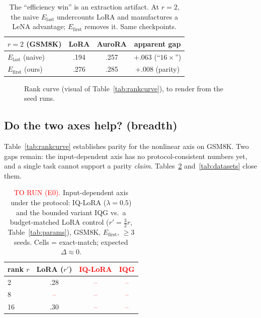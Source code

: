 \documentclass[preprint,11pt]{elsarticle}
\begin{document}
\begin{table}[t]\centering
\caption{The ``efficiency win'' is an extraction artifact. At $r{=}2$, the naive $E_{\text{last}}$ undercounts LoRA and
manufactures a LeNA advantage; $E_{\text{first}}$ removes it. Same checkpoints.}
\label{tab:artifact}
\begin{tabular}{lccc}
\toprule
$r{=}2$ (GSM8K) & LoRA & AuroRA & apparent gap\\
\midrule
$E_{\text{last}}$ (naive)  & .194 & .257 & $+.063$ (``$16\times$'')\\
$E_{\text{first}}$ (ours)  & .276 & .285 & $+.008$ (parity)\\
\bottomrule
\end{tabular}
\end{table}

\begin{figure}[t]\centering
{}
\caption{Rank curve (visual of Table~\ref{tab:rankcurve}), to render from the seed runs.}
\label{fig:rankcurve}
\end{figure}

\subsection{Do the two axes help? (breadth)}
Table~\ref{tab:rankcurve} establishes parity for the nonlinear axis on GSM8K. Two gaps remain: the input-dependent axis has
no protocol-consistent numbers yet, and a single task cannot support a parity \emph{claim}. Tables~\ref{tab:iqrank}
and~\ref{tab:datasets} close them.

\begin{table}[t]\centering
\caption{\textcolor{red}{TO RUN (E0).} Input-dependent axis under the protocol: IQ-LoRA ($\lambda{=}0.5$) and the bounded
variant IQG vs.\ a budget-matched LoRA control ($r'{=}\tfrac32 r$, Table~\ref{tab:params}), GSM8K, $E_{\text{first}}$,
$\ge3$ seeds. Cells = exact-match; expected $\Delta\approx0$.}
\label{tab:iqrank}
\begin{tabular}{lccc}
\toprule
rank $r$ & LoRA ($r'$) & \textcolor{red}{IQ-LoRA} & \textcolor{red}{IQG}\\
\midrule
2  & .28 & \textcolor{red}{--} & \textcolor{red}{--}\\
8  & \textcolor{red}{--} & \textcolor{red}{--} & \textcolor{red}{--}\\
16 & .30 & \textcolor{red}{--} & \textcolor{red}{--}\\
\bottomrule
\end{tabular}
\end{table}
\end{document}
